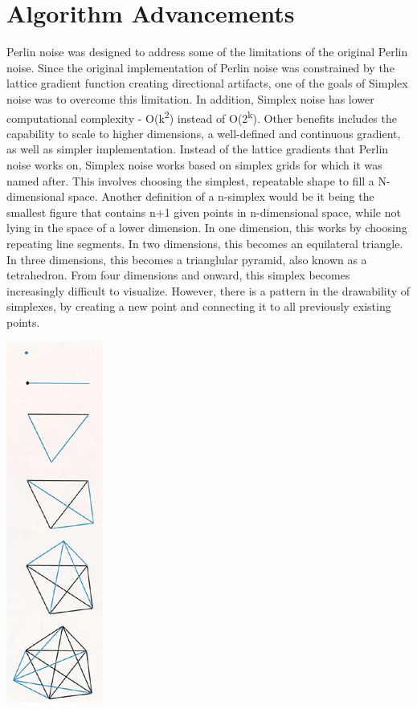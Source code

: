 \documentclass[10pt]{report}
\begin{document}
		\cite{Liu_2020}
		
		\section{Algorithm Advancements}
		
		Perlin noise was designed to address some of the limitations of the original Perlin noise. Since the original implementation of Perlin noise was constrained by the lattice gradient function creating directional artifacts, one of the goals of Simplex noise was to overcome this limitation. In addition, Simplex noise has lower computational complexity - O(k\textsuperscript{2}) instead of O(2\textsuperscript{k})\cite{sheet-simplex}. Other benefits includes the capability to scale to higher dimensions, a well-defined and continuous gradient, as well as simpler implementation. Instead of the lattice gradients that Perlin noise works on, Simplex noise works based on simplex grids for which it was named after. This involves choosing the simplest, repeatable shape to fill a N-dimensional space. Another definition of a n-simplex would be it being the smallest figure that contains n+1 given points in n-dimensional space, while not lying in the space of a lower dimension. In one dimension, this works by choosing repeating line segments. In two dimensions, this becomes an equilateral triangle. In three dimensions, this becomes a trianglular pyramid, also known as a tetrahedron. From four dimensions and onward, this simplex becomes increasingly difficult to visualize. However, there is a pattern in the drawability of simplexes, by creating a new point and connecting it to all previously existing points.
		
		\begin{minipage}{\textwidth}
			\centering
			\includegraphics[scale=.75]{six simplexes}
			\label{fig:fig2}
		\end{minipage}
	
\end{document}
